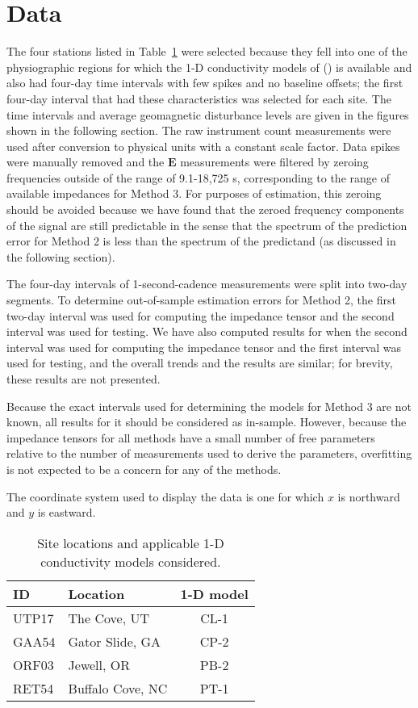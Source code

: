 \documentclass[12pt]{article}
\begin{document}
\section{Data}

The four stations listed in Table~\ref{table:SiteLocations} were selected because they fell into one of the physiographic regions for which the 1-D conductivity models of (\cite{Fernberg2012}) is available and also had four-day time intervals with few spikes and no baseline offsets; the first four-day interval that had these characteristics was selected for each site.  The time intervals and average geomagnetic disturbance levels are given in the figures shown in the following section.  The raw instrument count measurements were used after conversion to physical units with a constant scale factor.  Data spikes were manually removed and the $\mathbf{E}$ measurements were filtered by zeroing frequencies outside of the range of 9.1-18,725 s, corresponding to the range of available impedances for Method 3.  For purposes of estimation, this zeroing should be avoided because we have found that the zeroed frequency components of the signal are still predictable in the sense that the spectrum of the prediction error for Method 2 is less than the spectrum of the predictand (as discussed in the following section).

The four-day intervals of 1-second-cadence measurements were split into two-day segments.  To determine out-of-sample estimation errors for Method 2, the first two-day interval was used for computing the impedance tensor and the second interval was used for testing. We have also computed results for when the second interval was used for computing the impedance tensor and the first interval was used for testing, and the overall trends and the results are similar; for brevity, these results are not presented.

Because the exact intervals used for determining the models for Method 3 are not known, all results for it should be considered as in-sample. However, because the impedance tensors for all methods have a small number of free parameters relative to the number of measurements used to derive the parameters, overfitting is not expected to be a concern for any of the methods.

The coordinate system used to display the data is one for which $x$ is northward and $y$ is eastward.

\begin{table}
\centering
\begin{tabular}{ l | l | c }
  ID    & Location & 1-D model \\
  \hline
  UTP17 & The Cove, UT & CL-1 \\
  GAA54 & Gator Slide, GA & CP-2 \\
  ORF03 & Jewell, OR & PB-2 \\
  RET54 & Buffalo Cove, NC & PT-1
\end{tabular}
\caption{Site locations and applicable 1-D conductivity models considered.}
\label{table:SiteLocations}
\end{table}
\end{document}
